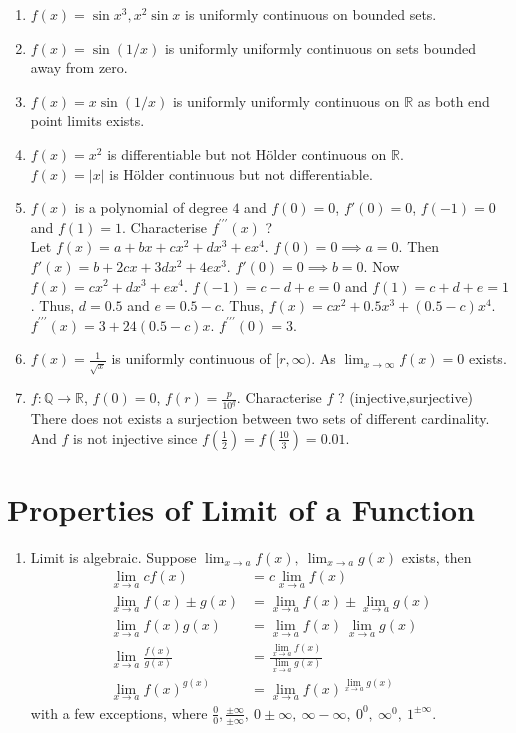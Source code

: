 \begin{enumerate}
	\item $f(x) = \sin x^3, x^2 \sin x$ is uniformly continuous on bounded sets.
	\item $f(x) = \sin (1/x)$ is uniformly uniformly continuous on sets bounded away from zero.
	\item $f(x) = x \sin (1/x)$ is uniformly uniformly continuous on $\mathbb{R}$ as both end point limits exists.
	\item $f(x) = x^2$ is differentiable but not H\"older continuous on $\mathbb{R}$.\\
		$f(x) = |x|$ is H\"older continuous but not differentiable.
	\item $f(x)$ is a polynomial of degree $4$ and $f(0) = 0$, $f'(0) = 0$, $f(-1) = 0$ and $f(1) = 1$. Characterise $f^{\prime\prime\prime}(x)$ ?\\
		Let $f(x) = a + bx + cx^2 + dx^3 + ex^4$. $f(0) = 0 \implies a = 0$. Then $f'(x) = b + 2cx + 3dx^2 + 4ex^3$. $f'(0) = 0 \implies b = 0$. Now $f(x) = cx^2 + dx^3 + ex^4$. $f(-1) = c - d + e = 0$ and $f(1) = c+d+e = 1$. Thus, $d = 0.5$ and $e = 0.5-c$. Thus, $f(x) = cx^2 +0.5x^3 + (0.5-c)x^4$. $f^{\prime\prime\prime}(x) = 3 + 24(0.5-c)x$. $f^{\prime\prime\prime}(0) = 3$.
	\item $f(x) = \frac{1}{\sqrt{x}}$ is uniformly continuous of $[r,\infty)$. As $\lim_{x \to \infty} f(x) = 0$ exists.
	\item $f : \mathbb{Q} \to \mathbb{R}$, $f(0) = 0$, $f(r) = \frac{p}{10^q}$. Characterise $f$ ? (injective,surjective)\\
		There does not exists a surjection between two sets of different cardinality. And $f$ is not injective since $f(\frac{1}{2}) = f(\frac{10}{3}) = 0.01$.
\end{enumerate}

\section{Properties of Limit of a Function}
\begin{enumerate}
	\item Limit is algebraic.
		Suppose $\displaystyle \lim_{x \to a} f(x),\ \lim_{x \to a} g(x)$ exists, then
	\begin{align}
		\lim_{x \to a} cf(x) & = c\lim_{x \to a} f(x) \\
		\lim_{x \to a} f(x) \pm g(x)  & = \lim_{x \to a} f(x) \pm \lim_{x \to a}g(x) \\
		\lim_{x \to a} f(x)g(x) & = \lim_{x \to a}f(x) \ \lim_{x \to a}g(x) \\
		\lim_{x \to a} \frac{f(x)}{g(x)} & = \frac{\displaystyle \lim_{x \to a}f(x)}{\displaystyle \lim_{x \to a}g(x)} \\
		\lim_{x \to a} f(x)^{g(x)} & = \lim_{x \to a}f(x)^{\displaystyle \lim_{x \to a}g(x)}
	\end{align}
		with a few exceptions, where $ \frac{0}{0}, \frac{\pm \infty}{\pm \infty},\ 0 \pm \infty,\ \infty - \infty,\ 0^0,\ \infty^0,\ 1^{\pm\infty} $.
\end{enumerate}

